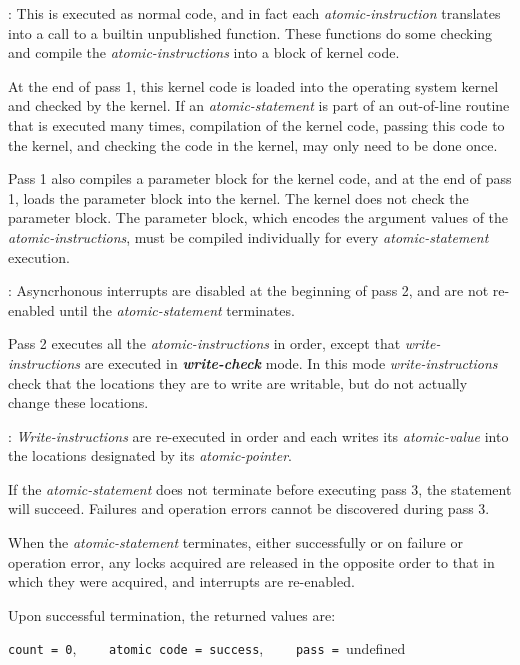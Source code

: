 \documentclass[12pt]{article}
\newcommand{\key}[1]{{\bf \em #1}\index{#1}}
\newenvironment{indpar}[1][0.3in]%
	{\begin{list}{}%
		     {\setlength{\itemsep}{0in}%
		      \setlength{\topsep}{0in}%
		      \setlength{\parsep}{1ex}%
		      \setlength{\labelwidth}{#1}%
		      \setlength{\leftmargin}{#1}%
		      \addtolength{\leftmargin}{\labelsep}}%
	 \item}%
	{\end{list}}
\begin{document}
\begin{indpar}[0.6in]
\hspace*{-0.3in}{\bf Pass 1, Compilation Pass}:
This is executed as normal code, and in fact each {\em atomic-instruction}
translates into a call to a builtin unpublished function.  These functions
do some checking and compile the {\em atomic-instructions} into a block
of kernel code.

At the end of pass 1, this kernel code is loaded into the operating
system kernel and checked by the kernel.
If an {\em atomic-statement}
is part of an out-of-line routine that is executed many times, compilation
of the kernel code, passing this code to the kernel, and checking the
code in the kernel, may only need to be done once.

Pass 1 also compiles a parameter block for the kernel code, and at the end
of pass 1, loads the parameter block into the kernel.  The kernel does
not check the parameter block.  The parameter block, which encodes the
argument values of the {\em atomic-instructions}, must be compiled
individually for every
{\em atomic-statement} execution.

\hspace*{-0.3in}{\bf Pass 2, Test Pass}: Asyncrhonous interrupts are
disabled at the beginning of pass 2, and are not re-enabled until
the {\em atomic-statement} terminates.

Pass 2 executes all the {\em atomic-instructions} in order, except that
{\em write-instructions} are executed in \key{write-check} mode.
In this mode {\em write-instructions} check that the locations
they are to write are writable, but do not actually change these locations.

\hspace*{-0.3in}{\bf Pass 3, Set Pass}: 
{\em Write-instructions} are re-executed in order and each writes its
{\em atomic-value} into the locations designated by its
{\em atomic-pointer}.

If the {\em atomic-statement} does not
terminate before executing pass 3, the statement will succeed.
Failures and operation errors cannot be discovered during pass 3.

When the {\em atomic-statement} terminates, either successfully or
on failure or operation error,
any locks acquired are released in the opposite order
to that in which they were acquired, and interrupts are re-enabled.

Upon successful termination, the returned values are:
\begin{center}
{\tt count = 0},~~~~ {\tt atomic code = success},~~~~
{\tt pass = }undefined
\end{center}
\end{indpar}
\end{document}
